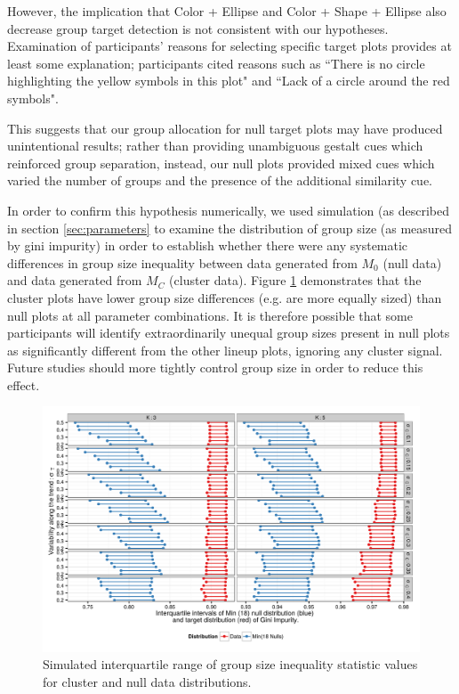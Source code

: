 \documentclass[11pt]{isuthesis}\usepackage[]{graphicx}\usepackage[]{color}
\newenvironment{knitrout}{}{} %
\begin{document}
However, the implication that Color + Ellipse and Color + Shape + Ellipse also decrease group target detection is not consistent with our hypotheses. Examination of participants' reasons for selecting specific target plots provides at least some explanation; participants cited reasons such as 
``There is no circle highlighting the yellow symbols in this plot" %
and 
``Lack of a circle around the red symbols".  %

This suggests that our group allocation for null target plots may have produced unintentional results; rather than providing unambiguous gestalt cues which reinforced group separation, instead, our null plots provided mixed cues which varied the number of groups and the presence of the additional similarity cue. 

In order to confirm this hypothesis numerically, we used simulation (as described in section \ref{sec:parameters} to examine the distribution of group size (as measured by gini impurity) in order to establish whether there were any systematic differences in group size inequality between data generated from $M_0$ (null data) and data generated from $M_C$ (cluster data). Figure \ref{fig:simulationGiniIntervals} demonstrates that the cluster plots have lower group size differences (e.g. are more equally sized) than null plots at all parameter combinations. It is therefore possible that some participants will identify extraordinarily unequal group sizes present in null plots as significantly different from the other lineup plots, ignoring any cluster signal. Future studies should more tightly control group size in order to reduce this effect. 

\begin{figure}[ht]\centering
\begin{knitrout}
\color{fgcolor}

{\centering \includegraphics[width=.8\linewidth]{Figure/FeatureHierarchy/fig-simulationparameters-gini-1} 

}



\end{knitrout}
\caption[Simulated IQR of gini inequality for cluster and null distributions]{Simulated interquartile range of group size inequality statistic values for cluster and null data distributions. \label{fig:simulationGiniIntervals}}
\end{figure}
\end{document}
